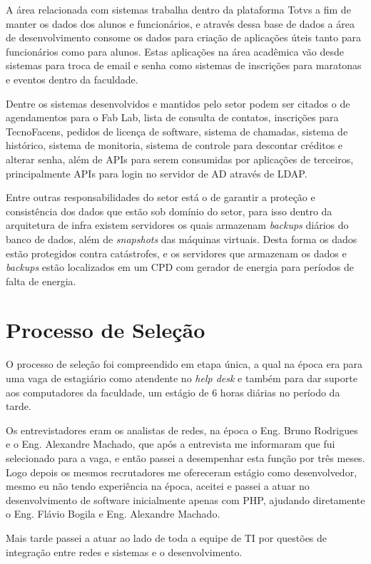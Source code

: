 \documentclass[
	12pt,				%
	oneside,			%
	a4paper,			%
	chapter=TITLE,		%
	section=TITLE,		%
	sumario=tradicional %
	english,			%
	french,				%
	spanish,			%
	brazil				%
	]{abntex2}
\begin{document}
A área relacionada com sistemas trabalha dentro da plataforma Totvs a fim de manter os dados dos alunos e funcionários, e através dessa base de dados a área de desenvolvimento consome os dados para criação de aplicações úteis tanto para funcionários como para alunos. Estas aplicações na área acadêmica vão desde sistemas para troca de email e senha como sistemas de inscrições para maratonas   e eventos dentro da faculdade.

Dentre os sistemas desenvolvidos e mantidos pelo setor podem ser citados o de agendamentos para o Fab Lab, lista de consulta de contatos, inscrições para TecnoFacens, pedidos de licença de software, sistema de chamadas, sistema de histórico, sistema de monitoria, sistema de controle para descontar créditos e alterar senha, além de APIs para serem consumidas por aplicações de terceiros, principalmente APIs para login no servidor de AD através de LDAP.

Entre outras responsabilidades do setor está o de garantir a proteção e consistência dos dados que estão sob domínio do setor, para isso dentro da arquitetura de infra existem servidores os quais armazenam \textit{backups} diários do banco de dados, além de \textit{snapshots} das máquinas virtuais. Desta forma os dados estão protegidos contra catástrofes, e os servidores que armazenam os dados e \textit{backups} estão localizados em um CPD com gerador de energia para períodos de falta de energia.

\section{Processo de Seleção}
\label{sec:procselecao}
O processo de seleção foi compreendido em etapa única, a qual na época era para uma vaga de estagiário como atendente no \textit{help desk} e também para dar suporte aos computadores da faculdade, um estágio de 6 horas diárias no período da tarde. 

Os entrevistadores eram os analistas de redes, na época o Eng. Bruno Rodrigues e o Eng. Alexandre Machado, que após a entrevista me informaram que fui selecionado para a vaga, e então passei a desempenhar esta função por três meses. Logo depois os mesmos recrutadores me ofereceram estágio como desenvolvedor, mesmo eu não tendo experiência na época, aceitei e passei a atuar no desenvolvimento de software inicialmente apenas com PHP, ajudando diretamente o Eng. Flávio Bogila e Eng. Alexandre Machado.

Mais tarde passei a atuar ao lado de toda a equipe de TI por questões de integração entre redes e sistemas e o desenvolvimento.
\end{document}
